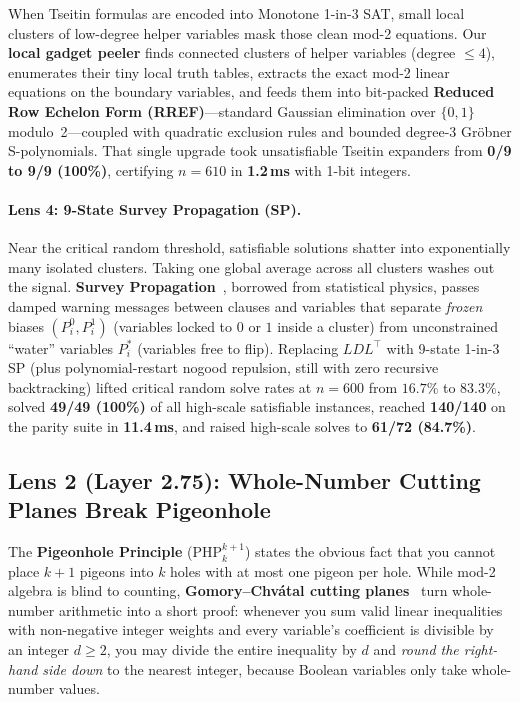 \documentclass[11pt]{article}
\begin{document}
When Tseitin formulas are encoded into Monotone 1-in-3 SAT, small local clusters of low-degree helper variables mask those clean mod-2 equations. Our \textbf{local gadget peeler} finds connected clusters of helper variables (degree $\le 4$), enumerates their tiny local truth tables, extracts the exact mod-2 linear equations on the boundary variables, and feeds them into bit-packed \textbf{Reduced Row Echelon Form (RREF)}---standard Gaussian elimination over $\{0, 1\}$ modulo~2---coupled with quadratic exclusion rules and bounded degree-3 Gr\"obner S-polynomials. That single upgrade took unsatisfiable Tseitin expanders from \textbf{0/9 to 9/9 (100\%)}, certifying $n = 610$ in \textbf{1.2\,ms} with 1-bit integers.

\paragraph{Lens 4: 9-State Survey Propagation (SP).}
Near the critical random threshold, satisfiable solutions shatter into exponentially many isolated clusters. Taking one global average across all clusters washes out the signal. \textbf{Survey Propagation}~\cite{mezard2002}, borrowed from statistical physics, passes damped warning messages between clauses and variables that separate \emph{frozen} biases $(P_i^0, P_i^1)$ (variables locked to $0$ or $1$ inside a cluster) from unconstrained ``water'' variables $P_i^*$ (variables free to flip). Replacing $LDL^\top$ with 9-state 1-in-3 SP (plus polynomial-restart nogood repulsion, still with zero recursive backtracking) lifted critical random solve rates at $n = 600$ from $16.7\%$ to $83.3\%$, solved \textbf{49/49 (100\%)} of all high-scale satisfiable instances, reached \textbf{140/140} on the parity suite in \textbf{11.4\,ms}, and raised high-scale solves to \textbf{61/72 (84.7\%)}.

\subsection{Lens 2 (Layer 2.75): Whole-Number Cutting Planes Break Pigeonhole}

The \textbf{Pigeonhole Principle} ($\mathrm{PHP}_k^{k+1}$) states the obvious fact that you cannot place $k+1$ pigeons into $k$ holes with at most one pigeon per hole. While mod-2 algebra is blind to counting, \textbf{Gomory--Chv\'atal cutting planes}~\cite{cook1987} turn whole-number arithmetic into a short proof: whenever you sum valid linear inequalities with non-negative integer weights and every variable's coefficient is divisible by an integer $d \ge 2$, you may divide the entire inequality by $d$ and \emph{round the right-hand side down} to the nearest integer, because Boolean variables only take whole-number values.
\end{document}
